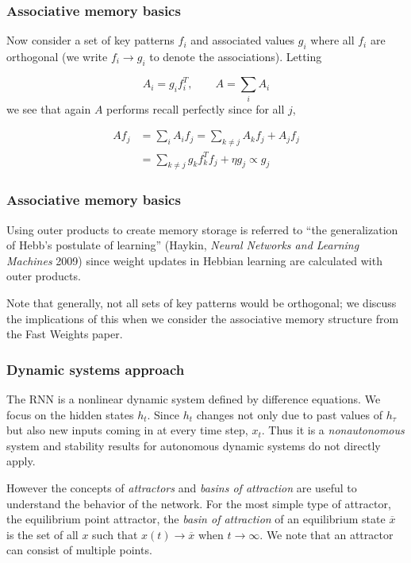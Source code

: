 \documentclass{beamer}
\begin{document}
\begin{frame}
  \frametitle{Associative memory basics}
Now consider a set of key patterns $f_i$ and associated values $g_i$ where all $f_i$ are orthogonal (we write $f_i \rightarrow g_i$ to denote the associations). Letting

\begin{equation*}
A_i = g_i f_i^T, \qquad A = \sum_{i} A_i
\end{equation*}
%
we see that again $A$ performs recall perfectly since for all $j$,

\begin{align*}
  A f_j & = \sum_{i}A_i f_j = \sum_{k \neq j} A_k f_j + A_j f_j \\
  & = \sum_{k \neq j} g_k f_k^T f_j + \eta g_j \propto g_j
\end{align*}
%
\end{frame}

\begin{frame}
  \frametitle{Associative memory basics}
  Using outer products to create memory storage is referred to ``the generalization of Hebb's postulate of learning'' (Haykin, \emph{Neural Networks and Learning Machines} 2009) since weight updates in Hebbian learning are calculated with outer products.

  \vspace{0.5cm}
  
  Note that generally, not all sets of key patterns would be orthogonal; we discuss the implications of this when we consider the associative memory structure from the Fast Weights paper.
\end{frame}

\begin{frame}
  \frametitle{Dynamic systems approach}
  The RNN is a nonlinear dynamic system defined by difference equations. We focus on the hidden states $h_t$. Since $h_t$ changes not only due to past values of $h_\tau$ but also new inputs coming in at every time step, $x_t$. Thus it is a \emph{nonautonomous} system and stability results for autonomous dynamic systems do not directly apply.

  \vspace{0.5cm}

  However the concepts of \emph{attractors} and \emph{basins of attraction} are useful to understand the behavior of the network. For the most simple type of attractor, the equilibrium point attractor, the \emph{basin of attraction} of an equilibrium state $\overline{x}$ is the set of all $x$ such that $x(t) \to \overline{x}$ when $t \to \infty$. We note that an attractor can consist of multiple points.
\end{frame}
\end{document}

